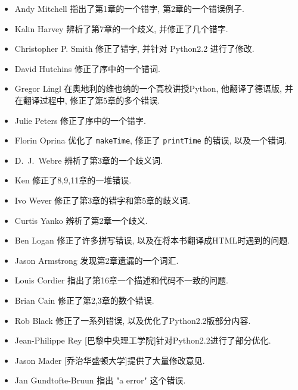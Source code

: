 \documentclass[10pt]{book}
\begin{document}
\begin{itemize}
\item Andy Mitchell 指出了第1章的一个错字, 第2章的一个错误例子. 

\item Kalin Harvey 辨析了第7章的一个歧义, 并修正了几个错字. 

\item Christopher P. Smith 修正了错字, 并针对 Python2.2 进行了修改. 

\item David Hutchins 修正了序中的一个错词. 

\item Gregor Lingl 在奥地利的维也纳的一个高校讲授Python, 他翻译了德语版, 并在翻译过程中, 修正了第5章的多个错误. 

\item Julie Peters 修正了序中的一个错字. 

\item Florin Oprina 优化了 {\tt makeTime}, 修正了 {\tt printTime} 的错误, 以及一个错词. 

\item D.~J.~Webre 辨析了第3章的一个歧义词. 

\item Ken 修正了8,9,11章的一堆错误. 

\item Ivo Wever 修正了第3章的错字和第5章的歧义词. 

\item Curtis Yanko 辨析了第2章一个歧义. 

\item Ben Logan 修正了许多拼写错误, 
以及在将本书翻译成HTML时遇到的问题. 

\item Jason Armstrong 发现第2章遗漏的一个词汇. 

\item Louis Cordier 指出了第16章一个描述和代码不一致的问题. 

\item Brian Cain 修正了第2,3章的数个错误. 

\item Rob Black 修正了一系列错误, 以及优化了Python2.2版部分内容. 

\item Jean-Philippe Rey [巴黎中央理工学院]针对Python2.2进行了部分优化. 

\item Jason Mader [乔治华盛顿大学]提供了大量修改意见. 

\item Jan Gundtofte-Bruun 指出 "a error" 这个错误. 


\end{itemize}
\end{document}
